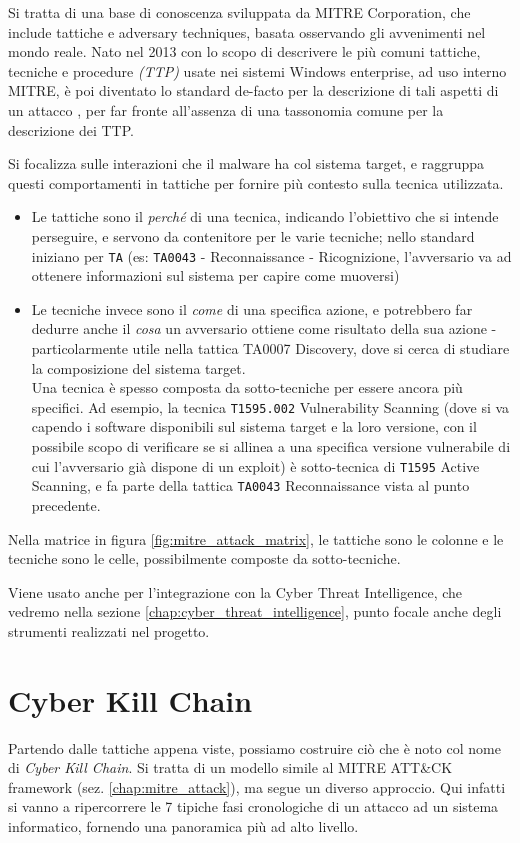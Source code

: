 Si tratta di una base di conoscenza sviluppata da MITRE Corporation, che include tattiche e adversary techniques, basata osservando gli avvenimenti nel mondo reale. Nato nel 2013 con lo scopo di descrivere le più comuni tattiche, tecniche e procedure \emph{(TTP)} usate nei sistemi Windows enterprise, ad uso interno MITRE, è poi diventato lo standard de-facto per la descrizione di tali aspetti di un attacco
\cite{mitre_attack_framework_introduction}, per far fronte all'assenza di una tassonomia comune per la descrizione dei TTP.

Si focalizza sulle interazioni che il malware ha col sistema target, e raggruppa questi comportamenti in tattiche per fornire più contesto sulla tecnica utilizzata.
\begin{itemize}
    \item Le tattiche sono il \emph{perché} di una tecnica, indicando l'obiettivo che si intende perseguire, e servono da contenitore per le varie tecniche; nello standard iniziano per \texttt{TA} (es: \texttt{TA0043} - Reconnaissance - Ricognizione, l'avversario va ad ottenere informazioni sul sistema per capire come muoversi)
    \item Le tecniche invece sono il \emph{come} di una specifica azione, e potrebbero far dedurre anche il \emph{cosa} un avversario ottiene come risultato della sua azione - particolarmente utile nella tattica TA0007 Discovery, dove si cerca di studiare la composizione del sistema target. \\
    Una tecnica è spesso composta da sotto-tecniche per essere ancora più specifici.
    Ad esempio, la tecnica \texttt{T1595.002} Vulnerability Scanning (dove si va capendo i software disponibili sul sistema target e la loro versione, con il possibile scopo di verificare se si allinea a una specifica versione vulnerabile di cui l'avversario già dispone di un exploit) è sotto-tecnica di \texttt{T1595} Active Scanning, e fa parte della tattica \texttt{TA0043} Reconnaissance vista al punto precedente.
\end{itemize}

Nella matrice in figura \ref{fig:mitre_attack_matrix}, le tattiche sono le colonne e le tecniche sono le celle, possibilmente composte da sotto-tecniche.

Viene usato anche per l'integrazione con la Cyber Threat Intelligence, che vedremo nella sezione \ref{chap:cyber_threat_intelligence}, punto focale anche degli strumenti realizzati nel progetto.

\section{Cyber Kill Chain}
Partendo dalle tattiche appena viste, possiamo costruire ciò che è noto col nome di \emph{Cyber Kill Chain}.
Si tratta di un modello simile al MITRE ATT\&CK framework (sez. \ref{chap:mitre_attack}), ma segue un diverso approccio. Qui infatti si vanno a ripercorrere le 7 tipiche fasi cronologiche di un attacco ad un sistema informatico, fornendo una panoramica più ad alto livello.

